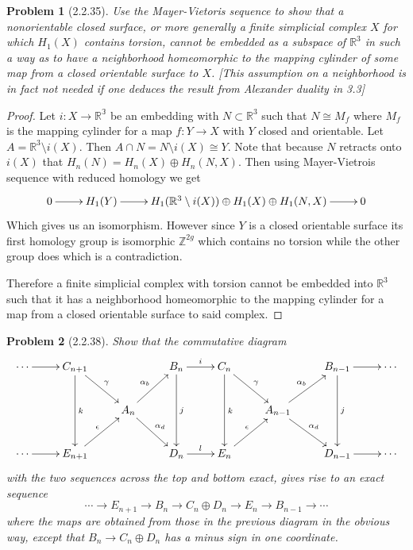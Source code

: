 \documentclass[10pt]{article}
\newcommand{\sk}{\vskip 10mm}
\newcommand{\bb}[1]{\mathbb{#1}}
\theoremstyle{plain}
\newtheorem{problem}{Problem}
\theoremstyle{remark}
\begin{document}
\begin{problem}[2.2.35]
  Use the Mayer-Vietoris sequence to show that a
  nonorientable closed surface, or more generally
  a finite simplicial complex $X$ for which $H_1(X)$
  contains torsion, cannot be embedded as a subspace
  of $\bb{R}^3$ in such a way as to have a neighborhood
  homeomorphic to the mapping cylinder of some map from a
  closed orientable surface to $X$. [This assumption on a
  neighborhood is in fact not needed if one deduces the
  result from Alexander duality in 3.3]
\end{problem}

\begin{proof}
  Let $i:X\rightarrow\bb{R^3}$ be an embedding with $N\subset \bb{R}^3$ such that
  $N\cong M_f$ where $M_f$ is the mapping cylinder for a map $f:Y\rightarrow X$
  with $Y$ closed and orientable. Let $A= \bb{R}^3\setminus i(X)$. Then
  $A\cap N = N\setminus i(X)\cong Y$. Note that because $N$ retracts onto $i(X)$ that
  $H_n(N)=H_n(X)\oplus H_n(N,X)$. Then using Mayer-Vietrois sequence with reduced
  homology we get
  \[
    \xymatrix{
      0\ar[r] & H_1(Y) \ar[r] & H_1(\bb{R}^3\setminus i(X))\oplus H_1(X)\oplus H_1(N,X) \ar[r] & 0
    }
  \]
  Which gives us an isomorphism. However since $Y$ is a closed orientable surface
  its first homology group is isomorphic $\bb{Z}^{2g}$ which contains no torsion while
  the other group does which is a contradiction.

  Therefore a finite simplicial complex with torsion cannot be embedded into $\bb{R}^3$
  such that it has a neighborhood homeomorphic to the mapping cylinder for a map
  from a closed orientable surface to said complex.
\end{proof}

\sk

\begin{problem}[2.2.38]
  Show that the commutative diagram
  \[
    \xymatrix{
      \cdots \ar[r] & C_{n+1} \ar[dd]^k \ar[rd]^\gamma & & B_n \ar[dd]^j \ar[r]^i & C_n \ar[dd]^k \ar[rd]^\gamma & & B_{n-1} \ar[r] \ar[dd]^j&\cdots\\
      && A_n \ar[ru]^{\alpha_b} \ar[rd]^{\alpha_d} & && A_{n-1} \ar[ru]^{\alpha_b} \ar[rd]^{\alpha_d} & \\
      \cdots \ar[r] & E_{n+1} \ar[ru]^\epsilon & & D_n \ar[r]^l & E_n \ar[ru]^\epsilon & & D_{n-1} \ar[r] &\cdots\\
    }
  \]
  with the two sequences across the top and bottom exact,
  gives rise to an exact sequence
  \[
    \cdots\rightarrow E_{n+1}\rightarrow B_n\rightarrow C_n\oplus D_n\rightarrow E_n\rightarrow B_{n-1}\rightarrow\cdots
  \]
  where the maps are obtained from those in the previous
  diagram in the obvious way, except that $B_n\rightarrow C_n\oplus D_n$
  has a minus sign in one coordinate.
\end{problem}
\end{document}
